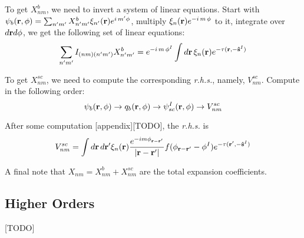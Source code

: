 \documentclass[main]{subfiles}
\begin{document}
To get $X^b_{nm}$, we need to invert a system of linear equations. Start with
$\psi_b(\mathbf{r},\phi)=\sum\nolimits_{n^{\prime} m^{\prime}}X^b_{n^{\prime} m^{\prime}}
\xi_{n^{\prime}}(\mathbf{r})e^{i\,m^{\prime}\phi}$, multiply $\xi_n(\mathbf{r})e^{-i\,m\,\phi}$ 
to it, integrate over $d\mathbf{r}d\phi$, we get the following set of linear equations:
\begin{equation*}
	\sum\limits_{n^{\prime} m^{\prime}} I_{(nm)(n^{\prime} m^{\prime})} X^b_{n^{\prime} m^{\prime}} =
	e^{-i\,m\,\phi^I}\int d\mathbf{r}\,\xi_n(\mathbf{r}) e^{-\tau(\mathbf{r},-\mathbf{\hat{s}}^I)}
\end{equation*}

To get $X^{sc}_{nm}$, we need to compute the corresponding \textit{r.h.s.},
namely, $V^{sc}_{nm}$. Compute in the following order:
\begin{equation*}
	\psi_b(\mathbf{r},\phi) \to q_b(\mathbf{r},\phi) \to \psi^I_{sc}(\mathbf{r},\phi) \to
	V^{sc}_{nm}
\end{equation*}

After some computation [appendix][TODO], the \textit{r.h.s.} is
\begin{equation*}
	V^{sc}_{nm}=\int d\mathbf{r}\,d\mathbf{r}^{\prime}\xi_n(\mathbf{r}) 
	\frac{e^{-im\phi_{\mathbf{r}-\mathbf{r}^{\prime}}}}{\left| \mathbf{r}-\mathbf{r}^{\prime} \right|}
	f(\phi_{\mathbf{r}-\mathbf{r}^{\prime}}-\phi^I) e^{-\tau(\mathbf{r}^{\prime},-\mathbf{\hat{s}}^I)}
\end{equation*}

A final note that $X_{nm}=X^{b}_{nm}+X^{sc}_{nm}$ are the total expansion
coefficients.

\subsection{Higher Orders}
\label{sub:higher orders} 
[TODO]

\end{document}
